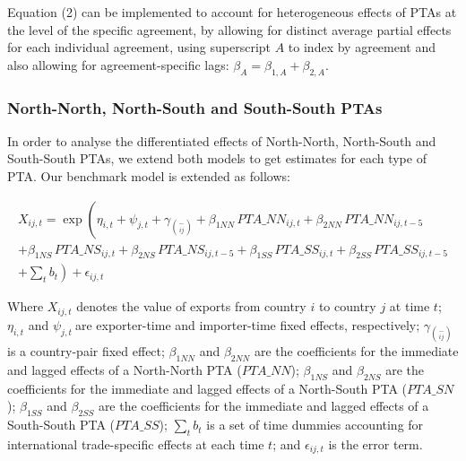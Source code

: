 \documentclass[12pt]{article}%
\begin{document}
Equation (2) can be implemented to account for heterogeneous effects of
PTAs at the level of the specific agreement, by allowing for distinct
average partial effects for each individual agreement, using superscript
\(A\) to index by agreement and also allowing for agreement-specific
lags: \(\beta_{A} = \beta_{1,A} + \beta_{2,A}\).%
\subsubsection{North{-}North, North{-}South and South{-}South PTAs}%
\label{ssubsec:North{-}North,North{-}SouthandSouth{-}SouthPTAs}%

%
In order to analyse the differentiated effects of North-North,
North-South and South-South PTAs, we extend both models to get estimates
for each type of PTA. Our benchmark model is extended as follows:

\begin{multline}
    X_{ij,t} = \exp\left(\eta_{i,t} + \psi_{j,t} + \gamma_{\binom{-}{ij}} + \beta_{1NN} \, PTA\_NN_{ij,t} + \beta_{2NN} \, PTA\_NN_{ij,t-5} \right. \\
    + \beta_{1NS} \, PTA\_NS_{ij,t} + \beta_{2NS} \, PTA\_NS_{ij,t-5} + \beta_{1SS} \, PTA\_SS_{ij,t} + \beta_{2SS} \, PTA\_SS_{ij,t-5} \\
    + \left. \sum_{t} b_{t} \right) + \epsilon_{ij,t}
\end{multline}

Where \(X_{ij,t}\)\hspace{0pt} denotes the value of exports from country
\(i\) to country \(j\) at time \(t\); \(\eta_{i,t}\) and
\(\psi_{j,t}\ \)are exporter-time and importer-time fixed effects,
respectively; \(\gamma_{\binom{-}{ij}}\) is a country-pair fixed effect;
\hspace{0pt}\(\beta_{1NN}\) and \(\beta_{2NN}\) are the coefficients for
the immediate and lagged effects of a North-North PTA (\(PTA\_ NN\));
\hspace{0pt}\hspace{0pt}\(\beta_{1NS}\) and \(\beta_{2NS}\) are the
coefficients for the immediate and lagged effects of a North-South PTA
(\(PTA\_ SN\)); \hspace{0pt}\hspace{0pt}\(\beta_{1SS}\) and
\(\beta_{2SS}\) are the coefficients for the immediate and lagged
effects of a South-South PTA (\(PTA\_ SS\)); \(\sum_{t}^{}b_{t}\) is a
set of time dummies accounting for international trade-specific effects
at each time \(t\); and \(\epsilon_{ij,t}\) is the error term.
\end{document}
